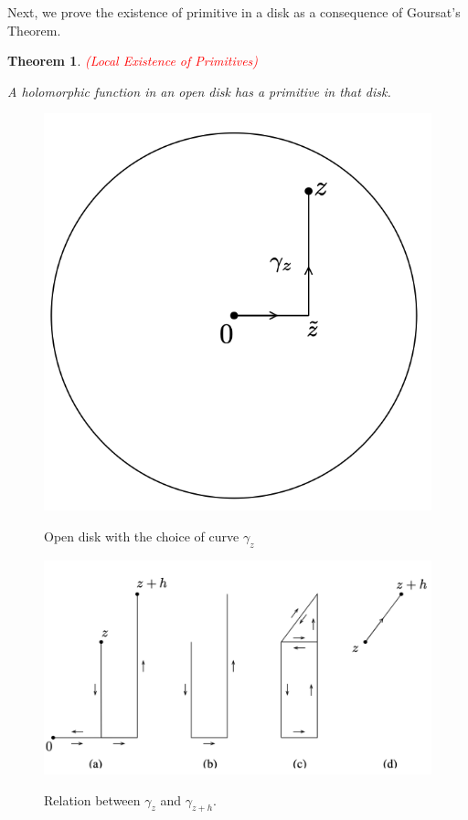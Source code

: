 \documentclass{article}
\newtheorem{theorem}{Theorem}
\begin{document}
Next, we prove the existence of primitive in a disk as a consequence of Goursat's Theorem. 

\begin{theorem} \textcolor{red}{(Local Existence of Primitives)}

A holomorphic function in an open disk has a primitive in that disk.
\end{theorem}

\begin{figure}
\centering
\includegraphics[scale=0.3]{local_primitive_1.png} \\
\caption{Open disk with the choice of curve $\gamma_z$} 
\label{fig:local_primitive_1}
\end{figure}

\begin{figure}
\centering
\includegraphics[scale=0.3]{local_primitive_2.png} \\
\caption{Relation between $\gamma_z$ and $\gamma_{z+h}$.} 
\label{fig:local_primitive_2}
\end{figure}
\end{document}

